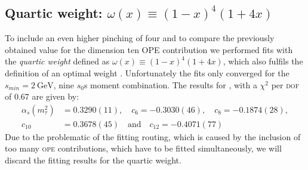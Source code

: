 \documentclass[../../index.tex]{subfiles}
\begin{document}
\subsection{Quartic weight: $\omega(x) \equiv (1-x)^4(1+4x)$}
\label{sec:quarticWeight}
To include an even higher pinching of four and to compare the previously
obtained value for the dimension ten \textsc{OPE} contribution we performed fits
with the \textit{quartic weight} defined as $\omega(x) \equiv (1-x)^4(1+4x)$,
which also fulfils the definition of an optimal weight \cite{Beneke2012}. 
Unfortunately the fits only converged for the $s_{min}=\SI{2}{\giga\eV}$, nine $s_0$s
moment combination. The results for , with a $\chi^2$ per \textsc{dof} of $0.67$ are given by:
\begin{equation}
  \begin{split}
  \alpha_s(m_\tau^2) &= 0.3290(11), \quad c_6=-0.3030(46), \quad c_8=-0.1874(28), \\
  c_{10} &= 0.3678(45) \quad \text{and} \quad c_{12}=-0.4071(77)
  \end{split}
\end{equation}
Due to the problematic of the fitting routing, which is caused by the inclusion
of too many \textsc{ope} contributions, which have to be fitted simultaneously,
we will discard the fitting results for the quartic weight.
\end{document}
